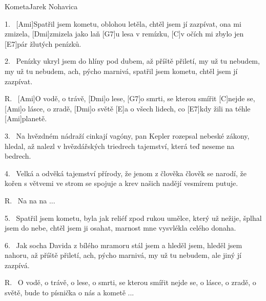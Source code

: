 \begin{song}{Kometa}{Jarek Nohavica}

\begin{xverse}{1.~}
[Ami]Spatřil jsem kometu, oblohou letěla,
chtěl jsem jí zazpívat, ona mi zmizela,
[Dmi]zmizela jako laň [G7]u lesa v remízku,
[C]v očích mi zbylo jen [E7]pár žlutých penízků.
\end{xverse}

\begin{xverse}{2.~}
Penízky ukryl jsem do hlíny pod dubem,
až příště přiletí, my už tu nebudem,
my už tu nebudem, ach, pýcho marnivá,
spatřil jsem kometu, chtěl jsem jí zazpívat.
\end{xverse}

\begin{xverse}{R.~}
[Ami]O vodě, o trávě, [Dmi]o lese,
[G7]o smrti, se kterou smířit [C]nejde se,
[Ami]o lásce, o zradě, [Dmi]o světě
[E]a o všech lidech, co [E7]kdy žili na téhle [Ami]planetě.
\end{xverse}

\begin{xverse}{3.~}
Na hvězdném nádraží cinkají vagóny,
pan Kepler rozepsal nebeské zákony,
hledal, až nalezl v hvězdářských triedrech
tajemství, která teď neseme na bedrech.
\end{xverse}

\begin{xverse}{4.~}
Velká a odvěká tajemství přírody,
že jenom z člověka člověk se narodí,
že kořen s větvemi ve strom se spojuje
a krev našich nadějí vesmírem putuje.
\end{xverse}

\begin{xverse}{R.~}
Na na na ...
\end{xverse}


\begin{xverse}{5.~}
Spatřil jsem kometu, byla jak reliéf
zpod rukou umělce, který už nežije,
šplhal jsem do nebe, chtěl jsem ji osahat,
marnost mne vysvlékla celého donaha.
\end{xverse}


\begin{xverse}{6.~}
Jak socha Davida z bílého mramoru
stál jsem a hleděl jsem, hleděl jsem nahoru,
až příště přiletí, ach, pýcho marnivá,
my už tu nebudem, ale jiný jí zazpívá.
\end{xverse}

\begin{xverse}{R.~}
O vodě, o trávě, o lese,
o smrti, se kterou smířit nejde se,
o lásce, o zradě, o světě,
bude to písnička o nás a kometě ...
\end{xverse}

\end{song}

